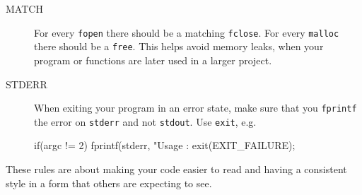 \begin{description}
\item[MATCH] For every \verb^fopen^ there should be a matching \verb^fclose^.
For every \verb^malloc^ there should be a \verb^free^.
This helps avoid memory leaks, when your program or functions are later used
in a larger project.

\item[STDERR] When exiting your program in an error state, make sure that you \verb^fprintf^ the error on \verb^stderr^ and not \verb^stdout^. Use \verb^exit^, e.g.
\begin{codesnippet}
if(argc != 2){
   fprintf(stderr, "Usage : %
   exit(EXIT_FAILURE);
}
\end{codesnippet}


\end{description}


These rules are about making your code easier to read and having a consistent
style in a form that others are expecting to see.

